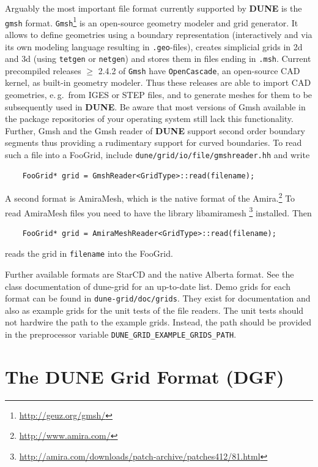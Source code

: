 \documentclass[11pt,a4paper,headinclude,footinclude,DIV16,headings=normal]{scrreprt}
\newcommand{\Dune}{{\sffamily\bfseries DUNE}\xspace}
\begin{document}
Arguably the most important file format currently supported by \Dune is
the \lstinline!gmsh! format.  \lstinline!Gmsh!\footnote{\url{http://geuz.org/gmsh/}}
is an open-source geometry modeler and grid generator.  It allows to define
geometries using a boundary representation (interactively and via its
own modeling language resulting in \lstinline!.geo!-files),
creates simplicial grids in 2d and 3d (using
\lstinline!tetgen! or \lstinline!netgen!)
and stores them in files ending in \lstinline!.msh!. Current precompiled
releases $\geq$ 2.4.2 of \lstinline!Gmsh! have \lstinline!OpenCascade!, an open-source CAD
kernel, as built-in geometry modeler. Thus these releases are able to import
CAD geometries, e.\,g.~from IGES or STEP files, and to generate meshes for them to
be subsequently used in \Dune. Be aware that most versions of Gmsh available in
the package repositories of your operating system still lack this functionality.
Further, Gmsh and the Gmsh reader of \Dune support second order
boundary segments thus providing a rudimentary support for curved boundaries.
To read such a file into a FooGrid, include \lstinline!dune/grid/io/file/gmshreader.hh!
and write
\begin{lstlisting}
    FooGrid* grid = GmshReader<GridType>::read(filename);
\end{lstlisting}

A second format is AmiraMesh, which is the native format of the Amira.\footnote{\url{http://www.amira.com/}}
To read AmiraMesh files you need to have the library libamiramesh%
\footnote{\url{http://amira.com/downloads/patch-archive/patches412/81.html}}
installed.  Then
\begin{lstlisting}
    FooGrid* grid = AmiraMeshReader<GridType>::read(filename);
\end{lstlisting}
reads the grid in \lstinline!filename! into the FooGrid.

Further available formats are StarCD and the native Alberta format.
See the class documentation of dune-grid for an up-to-date list.
Demo grids for each format can be found in \lstinline!dune-grid/doc/grids!.
They exist for documentation and also as example grids for the unit
tests of the file readers.  The unit tests should not hardwire the path
to the example grids.  Instead, the path should be provided in the preprocessor
variable \lstinline!DUNE_GRID_EXAMPLE_GRIDS_PATH!.


\section{The \texorpdfstring{\Dune}{Dune} Grid Format (DGF)}
\end{document}
